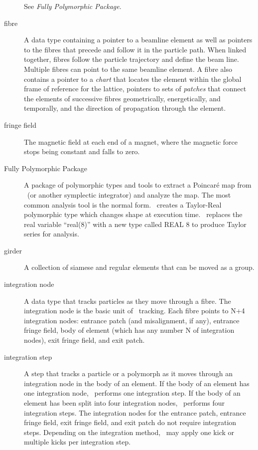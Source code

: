 \begin{description}
  \item[{}]
See \emph{Fully Polymorphic Package}.

  \item[fibre]
A data type containing a pointer to a beamline element as well as pointers
to the fibres that precede and follow it in the particle path.
When linked together, fibres follow the particle trajectory and define
the beam line. Multiple fibres can point to the same beamline element.  A
fibre also contains a pointer to a \emph{chart} that locates the element within
the global frame of reference for the lattice, pointers to sets of \emph{patches}
that connect the elements of successive fibres geometrically, energetically,
and temporally, and the direction of propagation through the element.

  \item[fringe field]
The magnetic field at each end of a magnet, where the magnetic force
stops being constant and falls to zero.

  \item[Fully Polymorphic Package]
A package of polymorphic types and tools to extract a Poincar\'e map
from \PTC\ (or another symplectic integrator) and analyze the map. The
most common analysis tool is the normal form. \FPP\ creates a Taylor-Real
polymorphic type which changes shape at execution time. \FPP\ replaces
the real variable ``real(8)'' with a new type called REAL 8 to
produce Taylor series for analysis.

  \item[girder]
A collection of siamese and regular elements that can be moved as
a group.

  \item[integration node]
A data type that tracks particles as they move through a fibre. The
integration node is the basic unit of \PTC\ tracking. Each fibre points to
N+4 integration nodes: entrance patch (and misalignment, if any),
entrance fringe field, body of element (which has any number N of
integration nodes), exit fringe field, and exit patch.

  \item[integration step]
A step that tracks a particle or a polymorph as it moves through an
integration node in the body of an element. If the body of an element
has one integration node, \PTC\ performs one integration step. If the body
of an element has been split into four integration nodes, \PTC\ performs four
integration steps. The integration nodes for the entrance patch, entrance
fringe field, exit fringe field, and exit patch do not require integration steps.
Depending on the integration method, \PTC\ may apply one kick or
multiple kicks per integration step.


\end{description}
